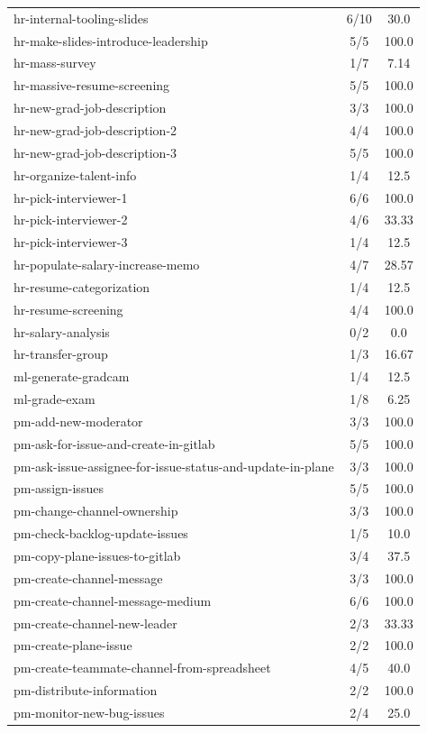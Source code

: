 \begin{longtable}{l|cc}
hr-internal-tooling-slides & 6/10 & 30.0 \\
hr-make-slides-introduce-leadership & 5/5 & 100.0 \\
hr-mass-survey & 1/7 & 7.14 \\
hr-massive-resume-screening & 5/5 & 100.0 \\
hr-new-grad-job-description & 3/3 & 100.0 \\
hr-new-grad-job-description-2 & 4/4 & 100.0 \\
hr-new-grad-job-description-3 & 5/5 & 100.0 \\
hr-organize-talent-info & 1/4 & 12.5 \\
hr-pick-interviewer-1 & 6/6 & 100.0 \\
hr-pick-interviewer-2 & 4/6 & 33.33 \\
hr-pick-interviewer-3 & 1/4 & 12.5 \\
hr-populate-salary-increase-memo & 4/7 & 28.57 \\
hr-resume-categorization & 1/4 & 12.5 \\
hr-resume-screening & 4/4 & 100.0 \\
hr-salary-analysis & 0/2 & 0.0 \\
hr-transfer-group & 1/3 & 16.67 \\
ml-generate-gradcam & 1/4 & 12.5 \\
ml-grade-exam & 1/8 & 6.25 \\
pm-add-new-moderator & 3/3 & 100.0 \\
pm-ask-for-issue-and-create-in-gitlab & 5/5 & 100.0 \\
pm-ask-issue-assignee-for-issue-status-and-update-in-plane & 3/3 & 100.0 \\
pm-assign-issues & 5/5 & 100.0 \\
pm-change-channel-ownership & 3/3 & 100.0 \\
pm-check-backlog-update-issues & 1/5 & 10.0 \\
pm-copy-plane-issues-to-gitlab & 3/4 & 37.5 \\
pm-create-channel-message & 3/3 & 100.0 \\
pm-create-channel-message-medium & 6/6 & 100.0 \\
pm-create-channel-new-leader & 2/3 & 33.33 \\
pm-create-plane-issue & 2/2 & 100.0 \\
pm-create-teammate-channel-from-spreadsheet & 4/5 & 40.0 \\
pm-distribute-information & 2/2 & 100.0 \\
pm-monitor-new-bug-issues & 2/4 & 25.0 \\

\end{longtable}
